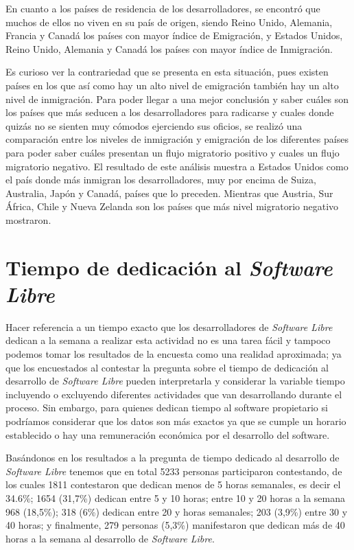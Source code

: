En cuanto a los países de residencia de los desarrolladores, se encontró que muchos de ellos no viven en su país de origen, siendo Reino Unido, Alemania, Francia y Canadá los países con mayor índice de Emigración, y Estados Unidos, Reino Unido, Alemania y Canadá los países con mayor índice de Inmigración. 

Es curioso ver la contrariedad que se presenta en esta situación, pues existen países en los que así como hay un alto nivel de emigración también hay un alto nivel de inmigración. Para poder llegar a una mejor conclusión y saber cuáles son los países que más seducen a los desarrolladores para radicarse y cuales donde quizás no se sienten muy cómodos ejerciendo sus oficios, se realizó una comparación entre los niveles de inmigración y emigración de los diferentes países para poder saber cuáles presentan un flujo migratorio positivo  y cuales un flujo migratorio negativo. El resultado de este análisis muestra a Estados Unidos como el país donde más inmigran los desarrolladores, muy por encima de Suiza, Australia, Japón y Canadá, países que lo preceden. Mientras que Austria, Sur África, Chile y Nueva Zelanda son los países que más nivel migratorio negativo mostraron.

\section{Tiempo de dedicación al \textit{Software Libre}}

Hacer referencia a un  tiempo exacto que los desarrolladores de \textit{Software Libre} dedican a la semana a realizar esta actividad no es una tarea fácil y tampoco podemos tomar los resultados de la encuesta como una realidad aproximada; ya que los encuestados al contestar la pregunta sobre el tiempo de dedicación al desarrollo de \textit{Software Libre} pueden interpretarla y considerar la variable tiempo incluyendo o excluyendo diferentes actividades que van desarrollando durante el proceso. Sin embargo, para quienes dedican tiempo al software propietario si podríamos considerar que los datos son más exactos ya que se cumple un horario establecido o hay una remuneración económica por el desarrollo del software.

Basándonos en los resultados a la pregunta de tiempo dedicado al desarrollo de \textit{Software Libre} tenemos que en total 5233 personas  participaron contestando, de los cuales 1811 contestaron que dedican menos de 5 horas semanales, es decir el 34.6\%; 1654 (31,7\%) dedican entre 5 y 10 horas; entre 10 y 20 horas a la semana 968 (18,5\%); 318 (6\%) dedican entre 20 y horas semanales; 203 (3,9\%) entre 30 y 40 horas; y finalmente, 279 personas (5,3\%) manifestaron que dedican más de 40 horas a la semana al desarrollo de \textit{Software Libre}.

